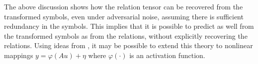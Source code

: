 The above discussion shows how the relation tensor can be recovered from the transformed symbols, even under adversarial noise, assuming there is sufficient redundancy in the symbols. This implies that it is possible to predict as well from the transformed symbols as from the relations, without explicitly recovering the relations.
Using ideas from \citep{surfing,HandV17}, it may be possible to extend this theory to nonlinear mappings
\(y = \varphi(Au) + \eta\) where \(\varphi(\cdot)\) is an activation function.


